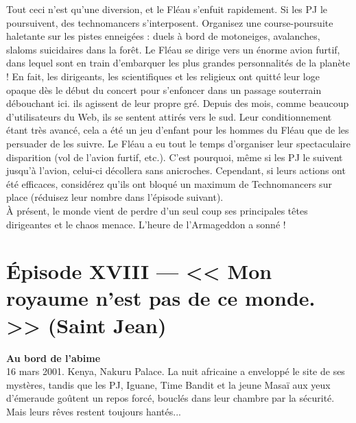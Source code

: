 \documentclass[11pt,twoside,a4paper]{book}
\begin{document}
Tout ceci n'est qu'une diversion, et le Fl{\'e}au s'enfuit rapidement. Si les PJ le poursuivent, des technomancers s'interposent. Organisez une course-poursuite haletante sur les pistes enneig{\'e}es : duels {\`a} bord de motoneiges, avalanches, slaloms suicidaires dans la for{\^e}t. Le Fl{\'e}au se dirige vers un {\'e}norme avion furtif, dans lequel sont en train d'embarquer les plus grandes personnalit{\'e}s de la plan{\`e}te ! En fait, les dirigeants, les scientifiques et les religieux ont quitt{\'e} leur loge opaque d{\`e}s le d{\'e}but du concert pour s'enfoncer dans un passage souterrain d{\'e}bouchant ici. ils agissent de leur propre gr{\'e}. Depuis des mois, comme beaucoup d'utilisateurs du Web, ils se sentent attir{\'e}s vers le sud. Leur conditionnement {\'e}tant tr{\`e}s avanc{\'e}, cela a {\'e}t{\'e} un jeu d'enfant pour les hommes du Fl{\'e}au que de les persuader de les suivre. Le Fl{\'e}au a eu tout le temps d'organiser leur spectaculaire disparition (vol de l'avion furtif, etc.). C'est pourquoi, m{\^e}me si les PJ le suivent jusqu'{\`a} l'avion, celui-ci d{\'e}collera sans anicroches. Cependant, si leurs actions ont {\'e}t{\'e} efficaces, consid{\'e}rez qu'ils ont bloqu{\'e} un maximum de Technomancers sur place (r{\'e}duisez leur nombre dans l'{\'e}pisode suivant).~\\

{\`A} pr{\'e}sent, le monde vient de perdre d'un seul coup ses principales t{\^e}tes dirigeantes et le chaos menace. L'heure de l'Armageddon a sonn{\'e} !~\\

\clearpage

\section*{{\'E}pisode XVIII --- << \textbf{Mon royaume n'est pas de ce monde. } >> (Saint Jean)}


\textbf{\large Au bord de l'abime}~\\

16 mars 2001. Kenya, Nakuru Palace. La nuit africaine a envelopp{\'e} le site de ses myst{\`e}res, tandis que les PJ, Iguane, Time Bandit et la jeune Masa{\"i} aux yeux d'{\'e}meraude go{\^u}tent un repos forc{\'e}, boucl{\'e}s dans leur chambre par la s{\'e}curit{\'e}. Mais leurs r{\^e}ves restent toujours hant{\'e}s...~\\
\end{document}
